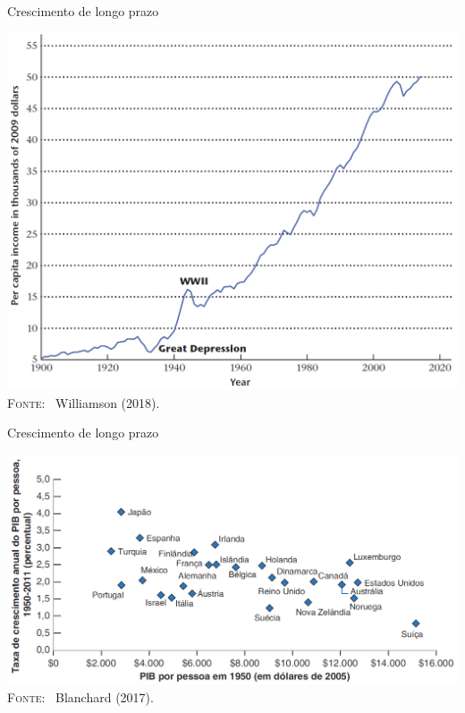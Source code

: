 \documentclass[10pt]{beamer}
\begin{document}
\begin{frame}{Crescimento de longo prazo}
    \begin{center}
        \begin{minipage}[b]{.58\textwidth}
            \includegraphics[width=\textwidth]{./figures/pib-usa.PNG}\\
            \tiny{{\scshape Fonte}: \ Williamson (2018).}
        \end{minipage}
    \end{center}
\end{frame}

\begin{frame}{Crescimento de longo prazo}
    \begin{center}
        \begin{minipage}[b]{0.9\textwidth}
            \includegraphics[width=\textwidth]{./figures/conv ocde.PNG}\\
            \tiny{{\scshape Fonte}: \ Blanchard (2017).}
        \end{minipage}
    \end{center}
\end{frame}
\end{document}
